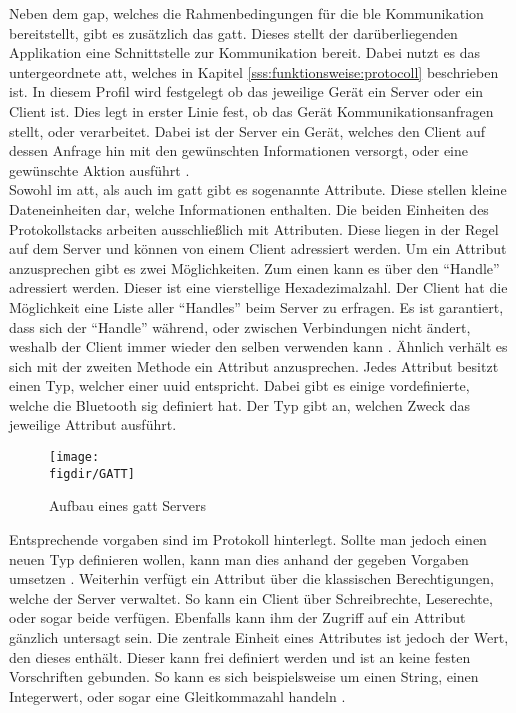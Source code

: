 \noindent Neben dem \ac{gap}, welches die Rahmenbedingungen für die \ac{ble} Kommunikation bereitstellt, gibt es zusätzlich das \ac{gatt}. Dieses stellt der darüberliegenden Applikation eine Schnittstelle zur Kommunikation bereit. Dabei nutzt es das untergeordnete \ac{att}, welches in Kapitel \ref{sss:funktionsweise:protocoll} beschrieben ist. In diesem Profil wird festgelegt ob das jeweilige Gerät ein Server oder ein Client ist. Dies legt in erster Linie fest, ob das Gerät Kommunikationsanfragen stellt, oder verarbeitet. Dabei ist der Server ein Gerät, welches den Client auf dessen Anfrage hin mit den gewünschten Informationen versorgt, oder eine gewünschte Aktion ausführt \cite[Seite 30]{Usama17:BBS}.\\

\noindent Sowohl im \ac{att}, als auch im \ac{gatt} gibt es sogenannte Attribute. Diese stellen kleine Dateneinheiten dar, welche Informationen enthalten. Die beiden Einheiten des Protokollstacks arbeiten ausschließlich mit Attributen. Diese liegen in der Regel auf dem Server und können von einem Client adressiert werden. Um ein Attribut anzusprechen gibt es zwei Möglichkeiten. Zum einen kann es über den "`Handle"' adressiert werden. Dieser ist eine vierstellige Hexadezimalzahl. Der Client hat die Möglichkeit eine Liste aller "`Handles"' beim Server zu erfragen. Es ist garantiert, dass sich der "`Handle"' während, oder zwischen Verbindungen nicht ändert, weshalb der Client immer wieder den selben verwenden kann \cite[Seite 53f]{Townsend14:GSB}. Ähnlich verhält es sich mit der zweiten Methode ein Attribut anzusprechen. Jedes Attribut besitzt einen Typ, welcher einer \ac{uuid} entspricht. Dabei gibt es einige vordefinierte, welche die Bluetooth \ac{sig} definiert hat. Der Typ gibt an, welchen Zweck das jeweilige Attribut ausführt. 
\begin{figure}[h]
	\centering
	\texttt{[image: \\figdir/GATT]}
	\caption{Aufbau eines \ac{gatt} Servers \cite[Seite 57]{Townsend14:GSB}}
	\label{FIG:gatt}
\end{figure}
Entsprechende vorgaben sind im Protokoll hinterlegt. Sollte man jedoch einen neuen Typ definieren wollen, kann man dies anhand der gegeben Vorgaben umsetzen \cite[Seite 31]{Usama17:BBS}. Weiterhin verfügt ein Attribut über die klassischen Berechtigungen, welche der Server verwaltet. So kann ein Client über Schreibrechte, Leserechte, oder sogar beide verfügen. Ebenfalls kann ihm der Zugriff auf ein Attribut gänzlich untersagt sein. Die zentrale Einheit eines Attributes ist jedoch der Wert, den dieses enthält. Dieser kann frei definiert werden und ist an keine festen Vorschriften gebunden. So kann es sich beispielsweise um einen String, einen Integerwert, oder sogar eine Gleitkommazahl handeln \cite[Seite 54ff]{Townsend14:GSB}.\\   

